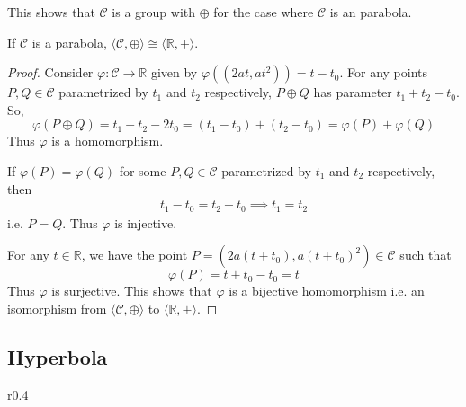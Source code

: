 \noindent
This shows that $\mathcal{C}$ is a group with $\oplus$ for the case where $\mathcal{C}$ is an
parabola.

\begin{theorem}
    If $\mathcal{C}$ is a parabola,
    $\langle \mathcal{C},\oplus \rangle \cong \langle \mathbb{R},+ \rangle$.
\end{theorem}

\begin{proof}
    Consider $\varphi:\mathcal{C} \to \mathbb{R}$ given by
    $\varphi((2at,at^2)) = t - t_0$. For any points
    $P,Q\in\mathcal{C}$ parametrized by $t_1$ and $t_2$ respectively,
    $P \oplus Q$ has parameter $t_1 + t_2 - t_0$. So,
    \[
        \varphi(P \oplus Q) = t_1 + t_2 - 2t_0 = (t_1 - t_0) + (t_2 - t_0)
        = \varphi(P) + \varphi(Q)
    \]
    Thus $\varphi$ is a homomorphism.
    \vspace{1ex}

    \noindent
    If $\varphi(P)=\varphi(Q)$ for some $P,Q\in\mathcal{C}$ parametrized by $t_1$ and
    $t_2$ respectively, then
    \begin{align*}
        t_1 - t_0 = t_2 - t_0 \implies t_1 = t_2
    \end{align*}
    i.e. $P=Q$. Thus $\varphi$ is injective.
    \vspace{1ex}

    \noindent
    For any $t \in \mathbb{R}$, we have the point
    $P=(2a(t + t_0),a(t + t_0)^2) \in \mathcal{C}$ such that
    \[ \varphi(P) = t + t_0 - t_0 = t \]
    Thus $\varphi$ is surjective. This shows that $\varphi$ is a bijective
    homomorphism i.e. an isomorphism from $\langle \mathcal{C},\oplus \rangle$ to
    $\langle \mathbb{R},+ \rangle$.
\end{proof}

\pagebreak

\subsection*{Hyperbola}

\begin{wrapfigure}{r}{0.4\textwidth}
    \centering

    \caption{}
\end{wrapfigure}

